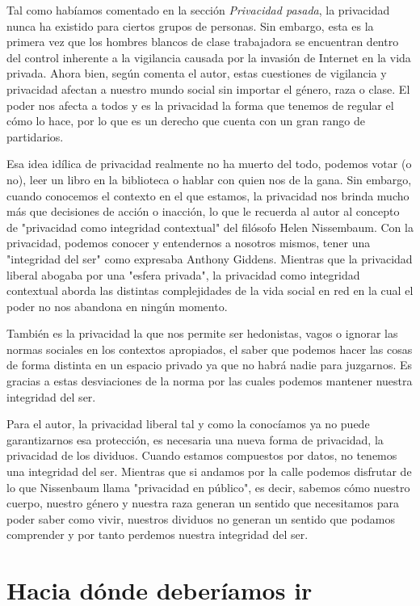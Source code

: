\documentclass[11pt]{article}
\begin{document}
Tal como habíamos comentado en la sección \textit{Privacidad pasada}, la privacidad nunca ha existido para ciertos grupos de personas. Sin embargo, esta es la primera vez que los hombres blancos de clase trabajadora se encuentran dentro del control inherente a la vigilancia causada por la invasión de Internet en la vida privada. Ahora bien, según comenta el autor, estas cuestiones de vigilancia y privacidad afectan a nuestro mundo social sin importar el género, raza o clase. El poder nos afecta a todos y es la privacidad la forma que tenemos de regular el cómo lo hace, por lo que es un derecho que cuenta con un gran rango de partidarios.

Esa idea idílica de privacidad realmente no ha muerto del todo, podemos votar (o no), leer un libro en la biblioteca o hablar con quien nos de la gana. Sin embargo, cuando conocemos el contexto en el que estamos, la privacidad nos brinda mucho más que decisiones de acción o inacción, lo que le recuerda al autor al concepto de "privacidad como integridad contextual" del filósofo Helen Nissembaum. Con la privacidad, podemos conocer y entendernos a nosotros mismos, tener una "integridad del ser" como expresaba Anthony Giddens. Mientras que la privacidad liberal abogaba por una "esfera privada", la privacidad como integridad contextual aborda las distintas complejidades de la vida social en red en la cual el poder no nos abandona en ningún momento.

También es la privacidad la que nos permite ser hedonistas, vagos o ignorar las normas sociales en los contextos apropiados, el saber que podemos hacer las cosas de forma distinta en un espacio privado ya que no habrá nadie para juzgarnos. Es gracias a estas desviaciones de la norma por las cuales podemos mantener nuestra integridad del ser.

Para el autor, la privacidad liberal tal y como la conocíamos ya no puede garantizarnos esa protección, es necesaria una nueva forma de privacidad, la privacidad de los dividuos. Cuando estamos compuestos por datos, no tenemos una integridad del ser. Mientras que si andamos por la calle podemos disfrutar de lo que Nissenbaum llama "privacidad en público", es decir, sabemos cómo nuestro cuerpo, nuestro género y nuestra raza generan un sentido que necesitamos para poder saber como vivir, nuestros dividuos no generan un sentido que podamos comprender y por tanto perdemos nuestra integridad del ser.
\section{Hacia dónde deberíamos ir}
\end{document}
